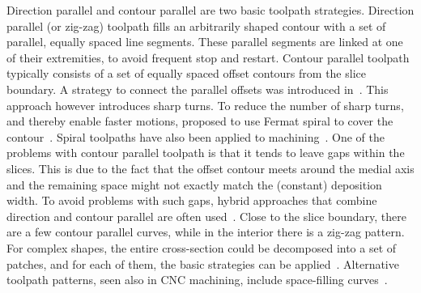 Direction parallel and contour parallel are two basic toolpath strategies.
Direction parallel (or zig-zag) toolpath fills an arbitrarily shaped contour with a set of parallel, equally spaced line segments.
These parallel segments are linked at one of their extremities, to avoid frequent stop and restart.
Contour parallel toolpath typically consists of a set of equally spaced offset contours from the slice boundary.
A strategy to connect the parallel offsets was introduced in~\cite{KUIPERS2019CAD}. This approach however introduces sharp turns.
To reduce the number of sharp turns, and thereby enable faster motions, \citeauthor{Zhao2016} proposed to use Fermat spiral to cover the contour~\cite{Zhao2016}. 
Spiral toolpaths have also been applied to machining~\cite{Held2009,Huang2017}.
One of the problems with contour parallel toolpath is that it tends to leave gaps within the slices.
This is due to the fact that the offset contour meets around the medial axis and the remaining space might not exactly match the (constant) deposition width.
To avoid problems with such gaps, hybrid approaches that combine direction and contour parallel are often used~\cite{Mcmains2000DETC,Jin2013adaptive}.
Close to the slice boundary, there are a few contour parallel curves, while in the interior there is a zig-zag pattern.
For complex shapes, the entire cross-section could be decomposed into a set of patches, and for each of them, the basic strategies can be applied~\cite{Ding2014,Jin2017RCIM}.
Alternative toolpath patterns, seen also in CNC machining, include space-filling curves~\cite{Cox1994CAD,Griffiths1994,Shaikh2016}.

